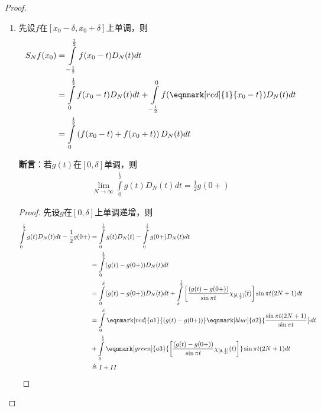 \begin{proof}
    \begin{enumerate}[leftmargin=1cm, label=\arabic*]
        \item 先设$f$在$[x_0-\delta,x_0+\delta]$上单调，则
        \begin{align*}
            S_N f(x_0) &= \int\limits_{-\frac{1}{2}}^{\frac{1}{2}} f(x_0 - t) D_N(t) dt \\
            & = \int\limits_{0}^{\frac{1}{2}} f(x_0-t) D_N(t) dt + \int\limits_{-\frac{1}{2}}^0 f(\eqnmark[red]{1}{x_0-t}) D_N(t) dt \\
            & = \int\limits_0^{\frac{1}{2}} \left(f(x_0-t) + f(x_0 + t) \right) D_N(t) dt
        \end{align*}

        \noindent\textbf{断言}：若$g(t)$在$[0,\delta]$单调，则
        \begin{align*}
            \lim\limits_{N\to\infty} \int\limits_{0}^{\frac{1}{2}} g(t) D_N(t) dt = \frac{1}{2} g(0+)
        \end{align*}
        \begin{proof}
            先设$g$在$[0,\delta]$上单调递增，则
            \begin{align*}
                \int\limits_0^{\frac{1}{2}} g(t)D_N(t) dt - \frac{1}{2}g(0+) &= \int\limits_0^{\frac{1}{2}} g(t) D_N(t) - \int\limits_0^{\frac{1}{2}} g(0+) D_N(t) dt \\
                & = \int\limits_0^{\frac{1}{2}} (g(t) - g(0+)) D_N(t) dt \\
                & = \int\limits_0^{\delta} (g(t) - g(0+)) D_N(t) dt + \int\limits_{\delta}^{\frac{1}{2}} \left[\frac{(g(t) - g(0+))}{\sin \pi t}\chi_{[\delta,\frac{1}{2}]}(t)\right]  \sin \pi t(2N+1) dt \\
                & = \int\limits_0^{\delta} \eqnmark[red]{a1}{(g(t) - g(0+))} \eqnmark[blue]{a2}{\frac{\sin\pi t(2N+1)}{\sin\pi t}} dt \\
                & + \int\limits_{\delta}^{\frac{1}{2}} \eqnmark[green]{a3}{\left[\frac{(g(t) - g(0+))}{\sin \pi t}\chi_{[\delta,\frac{1}{2}]}(t)\right]}  \sin \pi t(2N+1) dt \\
                & \triangleq I + II
            \end{align*}
            

\end{proof}
\end{enumerate}
\end{proof}
